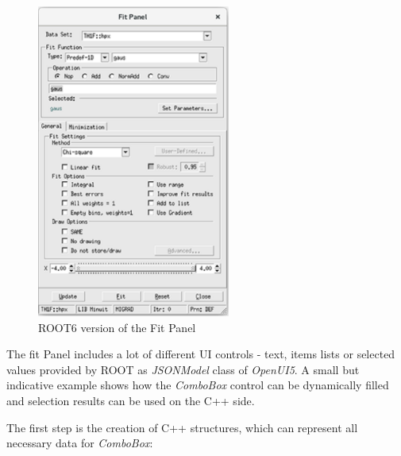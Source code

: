 \documentclass[a4paper]{jpconf}
\begin{document}
\begin{figure}[h]
\begin{minipage}{14pc}
\includegraphics[width=15pc]{oldPanel.eps}
\caption{\label{label}ROOT6 version of the Fit Panel}
\end{minipage}
\end{figure}


The fit Panel includes a lot of different UI controls - text, items lists or selected values provided by ROOT as \textit{JSONModel} class of \textit{OpenUI5}.
A small but indicative example shows how the \textit{ComboBox} control can be dynamically filled and selection results can be used on the C++ side.

The first step is the creation of C++ structures, which can represent all necessary data for \textit{ComboBox}:
\end{document}
